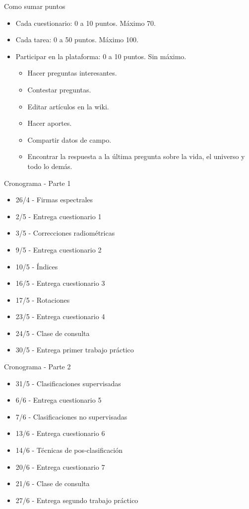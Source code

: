 \documentclass[]{beamer}
\begin{document}
\begin{frame}{Como sumar puntos}
  \begin{itemize}[<+->]
    \item Cada cuestionario: 0 a 10 puntos. Máximo 70.
    \item Cada tarea: 0 a 50 puntos. Máximo 100.
    \item Participar en la plataforma: 0 a 10 puntos. Sin máximo.
    \begin{itemize}
      \item Hacer preguntas interesantes.
      \item Contestar preguntas.
      \item Editar artículos en la wiki.
      \item Hacer aportes.
      \item Compartir datos de campo.
      \item Encontrar la respuesta a la última pregunta sobre la vida, el universo y todo lo demás.
    \end{itemize}
  \end{itemize}
\end{frame}
\begin{frame}{Cronograma - Parte 1}
    \begin{itemize}[<+->]
    \item 26/4 - Firmas espectrales
    \item 2/5 - Entrega cuestionario 1
    \item 3/5 - Correcciones radiométricas
    \item 9/5 - Entrega cuestionario 2
    \item 10/5 - Índices
    \item 16/5 - Entrega cuestionario 3
    \item 17/5 - Rotaciones
    \item 23/5 - Entrega cuestionario 4
    \item 24/5 - Clase de consulta
    \item 30/5 - Entrega primer trabajo práctico
  \end{itemize}
\end{frame}
\begin{frame}{Cronograma - Parte 2}
    \begin{itemize}[<+->]
    \item 31/5 - Clasificaciones supervisadas
    \item 6/6 - Entrega cuestionario 5
    \item 7/6 - Clasificaciones no supervisadas
    \item 13/6 - Entrega cuestionario 6
    \item 14/6 - Técnicas de pos-clasificación
    \item 20/6 - Entrega cuestionario 7
    \item 21/6 - Clase de consulta
    \item 27/6 - Entrega segundo trabajo práctico
  \end{itemize}
\end{frame}
\end{document}
